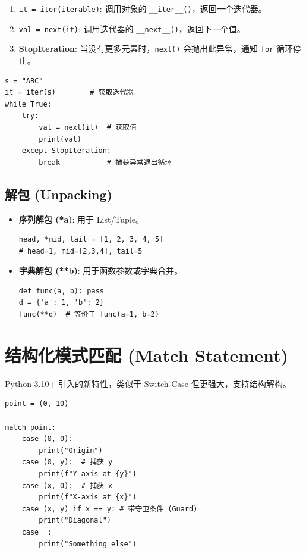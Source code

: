 \documentclass[12pt, a4paper]{article}
\begin{document}
\begin{enumerate}
    \item \texttt{it = iter(iterable)}: 调用对象的 \texttt{\_\_iter\_\_()}，返回一个迭代器。
    \item \texttt{val = next(it)}: 调用迭代器的 \texttt{\_\_next\_\_()}，返回下一个值。
    \item \textbf{StopIteration}: 当没有更多元素时，\texttt{next()} 会抛出此异常，通知 \texttt{for} 循环停止。
\end{enumerate}

\begin{lstlisting}[caption={模拟 for 循环底层实现}]
s = "ABC"
it = iter(s)        # 获取迭代器
while True:
    try:
        val = next(it)  # 获取值
        print(val)
    except StopIteration:
        break           # 捕获异常退出循环
\end{lstlisting}

\subsection{解包 (Unpacking)}

\begin{itemize}
    \item \textbf{序列解包 (*a)}: 用于 List/Tuple。
    \begin{lstlisting}
head, *mid, tail = [1, 2, 3, 4, 5]
# head=1, mid=[2,3,4], tail=5
    \end{lstlisting}
    
    \item \textbf{字典解包 (**b)}: 用于函数参数或字典合并。
    \begin{lstlisting}
def func(a, b): pass
d = {'a': 1, 'b': 2}
func(**d)  # 等价于 func(a=1, b=2)
    \end{lstlisting}
\end{itemize}

\section{结构化模式匹配 (Match Statement)}

Python 3.10+ 引入的新特性，类似于 Switch-Case 但更强大，支持结构解构。

\begin{lstlisting}[caption={Match 语法示例}]
point = (0, 10)

match point:
    case (0, 0):
        print("Origin")
    case (0, y):  # 捕获 y
        print(f"Y-axis at {y}")
    case (x, 0):  # 捕获 x
        print(f"X-axis at {x}")
    case (x, y) if x == y: # 带守卫条件 (Guard)
        print("Diagonal")
    case _:
        print("Something else")
\end{lstlisting}
\end{document}
